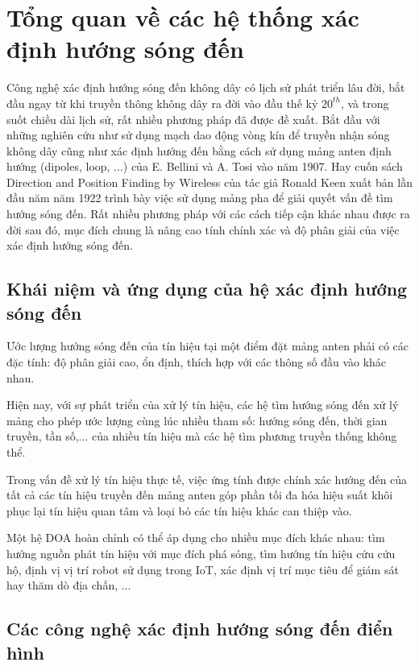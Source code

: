 \clearpage
{}

\setcounter{chapter}{0}
\chapter[{TỔNG QUAN VỀ CÁC HỆ THỐNG XÁC ĐỊNH HƯỚNG SÓNG ĐẾN}]{Tổng quan về các hệ thống xác định hướng sóng đến}

Công nghệ xác định hướng sóng đến không dây có lịch sử phát triển lâu đời, bắt đầu ngay từ khi truyền thông không dây ra đời vào đầu thế kỷ $20^{th}$, và trong suốt chiều dài lịch sử, rất nhiều phương pháp đã được đề xuất. Bắt đầu với những nghiên cứu như sử dụng mạch dao động vòng kín để truyền nhận sóng không dây cũng như xác định hướng đến bằng cách sử dụng mảng anten định hướng (dipoles, loop, ...) của  E. Bellini  và  A. Tosi \cite{Bellini1907} vào năm 1907. Hay cuốn sách Direction and Position Finding by Wireless \cite{Darwin1895} của tác giả Ronald Keen xuất bản lần đầu năm năm 1922 trình bày việc sử dụng mảng pha để giải quyết vấn đề tìm hướng sóng đến. Rất nhiều phương pháp với các cách tiếp cận khác nhau được ra đời sau đó, mục đích chung là nâng cao tính chính xác và độ phân giải của việc xác định hướng sóng đến.

\section{Khái niệm và ứng dụng của hệ xác định hướng sóng đến}

Ước lượng hướng sóng đến của tín hiệu tại một điểm đặt mảng anten phải có các đặc tính: độ phân giải cao, ổn định, thích hợp với các thông số đầu vào khác nhau.

Hiện nay, với sự phát triển của xử lý tín hiệu, các hệ tìm hướng sóng đến xử lý mảng cho phép ước lượng cùng lúc nhiều tham số: hướng sóng đến, thời gian truyền, tần số,... của nhiều tín hiệu mà các hệ tìm phương truyền thống không thể.

Trong vấn đề xử lý tín hiệu thực tế, việc ứng tính được chính xác hướng đến của tất cả các tín hiệu truyền đến mảng anten góp phần tối đa hóa hiệu suất khôi phục lại tín hiệu quan tâm và loại bỏ các tín hiệu khác can thiệp vào.

Một hệ DOA hoàn chỉnh có thể áp dụng cho nhiều mục đích khác nhau: tìm hướng nguồn phát tín hiệu với mục đích phá sóng, tìm hướng tín hiệu cứu cứu hộ, định vị vị trí robot sử dụng trong IoT, xác định vị trí mục tiêu để giám sát hay thăm dò địa chấn, ...
\newpage
\section{Các công nghệ xác định hướng sóng đến điển hình}

